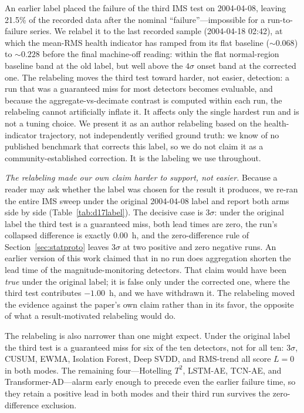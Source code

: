 \documentclass[IJPHM, 2026, 0]{PHMSociety}
\begin{document}
An earlier label placed the failure of the third IMS test on 2004-04-08, leaving 21.5\% of the recorded data after the nominal ``failure''---impossible for a run-to-failure series. We relabel it to the last recorded sample (2004-04-18 02:42), at which the mean-RMS health indicator has ramped from its flat baseline (${\sim}0.068$) to ${\sim}0.228$ before the final machine-off reading: within the flat normal-region baseline band at the old label, but well above the $4\sigma$ onset band at the corrected one. The relabeling moves the third test toward harder, not easier, detection: a run that was a guaranteed miss for most detectors becomes evaluable, and because the aggregate-vs-decimate contrast is computed within each run, the relabeling cannot artificially inflate it. It affects only the single hardest run and is not a tuning choice. We present it as an author relabeling based on the health-indicator trajectory, not independently verified ground truth: we know of no published benchmark that corrects this label, so we do not claim it as a community-established correction. It is the labeling we use throughout.

\emph{The relabeling made our own claim harder to support, not easier.} Because a reader may ask whether the label was chosen for the result it produces, we re-ran the entire IMS sweep under the original 2004-04-08 label and report both arms side by side (Table~\ref{tab:d17label}). The decisive case is $3\sigma$: under the original label the third test is a guaranteed miss, both lead times are zero, the run's collapsed difference is exactly $0.00$~h, and the zero-difference rule of Section~\ref{sec:statproto} leaves $3\sigma$ at two positive and zero negative runs. An earlier version of this work claimed that in no run does aggregation shorten the lead time of the magnitude-monitoring detectors. That claim would have been \emph{true} under the original label; it is false only under the corrected one, where the third test contributes $-1.00$~h, and we have withdrawn it. The relabeling moved the evidence against the paper's own claim rather than in its favor, the opposite of what a result-motivated relabeling would do.

The relabeling is also narrower than one might expect. Under the original label the third test is a guaranteed miss for six of the ten detectors, not for all ten: $3\sigma$, CUSUM, EWMA, Isolation Forest, Deep SVDD, and RMS-trend all score $L=0$ in both modes. The remaining four---Hotelling $T^2$, LSTM-AE, TCN-AE, and Transformer-AD---alarm early enough to precede even the earlier failure time, so they retain a positive lead in both modes and their third run survives the zero-difference exclusion.
\end{document}
